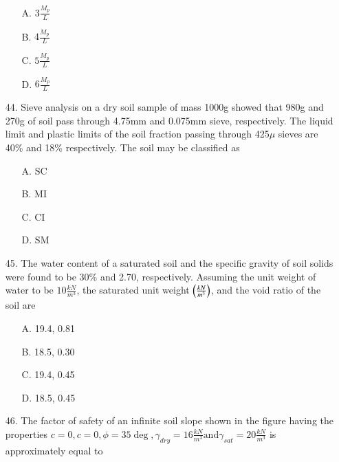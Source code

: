 \documentclass[journal]{IEEEtran}
\begin{document}
\begin{enumerate}
\begin{figure}[!ht]
    \label{fig:my_label3}
    \end{figure}
  \begin{enumerate}
    \item [A.] $3\frac{M_p}{L}$
    \item [B.] $4\frac{M_p}{L}$
    \item [C.] $5\frac{M_p}{L}$
    \item [D.] $6\frac{M_p}{L}$
  \end{enumerate}
  \item [44.] Sieve analysis on a dry soil sample of mass 1000g showed that 980g and 270g of
  soil pass through 4.75mm and 0.075mm sieve, respectively. The liquid limit and
  plastic limits of the soil fraction passing through 425$\mu$ sieves are 40\% and 18\%
  respectively. The soil may be classified as 
  \begin{enumerate}
    \item [A.] SC
    \item [B.] MI
    \item [C.] CI
    \item [D.] SM
  \end{enumerate}
  \item[45.] The water content of a saturated soil and the specific gravity of soil solids were
  found to be 30\% and 2.70, respectively. Assuming the unit weight of water to be
  $10\frac{kN}{m^3}$, the saturated unit weight $\left(\frac{kN}{m^3}\right)$, and the void ratio of the soil are 
  \begin{enumerate}
    \item [A.] 19.4, 0.81
    \item [B.] 18.5, 0.30
    \item [C.] 19.4, 0.45
    \item [D.] 18.5, 0.45
  \end{enumerate}
  \item [46.] The factor of safety of an infinite soil slope shown in the figure having the
  properties $c=0, c=0,\phi=35\deg,\gamma_{dry}=16\frac{kN}{m^3} \text{and} \gamma_{sat}=20\frac{kN}{m^3}$ is
  approximately equal to
  \begin{figure}[!ht]
    \centering
    

\end{figure}
\end{enumerate}
\end{document}
